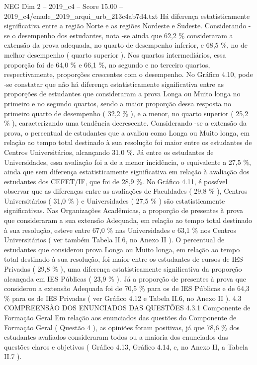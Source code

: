 \begin{textsample}{NEG Dim 2 – 2019\_c4 – Score 15.00 – 2019\_c4/enade\_2019\_arqui\_urb\_213c4ab7d4.txt}
Há diferença estatisticamente significativa entre a região Norte e as regiões Nordeste e Sudeste.
Considerando -se o desempenho dos estudantes, nota -se ainda que 62,2 \% consideraram a extensão da prova adequada, no quarto de desempenho inferior, e 68,5 \%, no de melhor desempenho ( quarto superior ).
Nos quartos intermediários, essa proporção foi de 64,0 \% e 66,1 \%, no segundo e no terceiro quartos, respectivamente, proporções crescentes com o desempenho.
No Gráfico 4.10, pode -se constatar que não há diferença estatisticamente significativa entre as proporções de estudantes que consideraram a prova Longa ou Muito longa no primeiro e no segundo quartos, sendo a maior proporção dessa resposta no primeiro quarto de desempenho ( 32,2 \% ), e a menor, no quarto superior ( 25,2 \% ), caracterizando uma tendência decrescente.
Considerando -se a extensão da prova, o percentual de estudantes que a avaliou como Longa ou Muito longa, em relação ao tempo total destinado à sua resolução foi maior entre os estudantes de Centros Universitários, alcançando 31,0 \%.
Já entre os estudantes de Universidades, essa avaliação foi a de a menor incidência, o equivalente a 27,5 \%, ainda que sem diferença estatisticamente significativa em relação à avaliação dos estudantes dos CEFET/IF, que foi de 28,9 \%.
No Gráfico 4.11, é possível observar que as diferenças entre as avaliações de Faculdades ( 29,8 \% ), Centros Universitários ( 31,0 \% ) e Universidades ( 27,5 \% ) são estatisticamente significativas.
Nas Organizações Acadêmicas, a proporção de presentes à prova que consideraram a sua extensão Adequada, em relação ao tempo total destinado à sua resolução, esteve entre 67,0 \% nas Universidades e 63,1 \% nos Centros Universitários ( ver também Tabela II.6, no Anexo II ).
O percentual de estudantes que considerou prova Longa ou Muito longa, em relação ao tempo total destinado à sua resolução, foi maior entre os estudantes de cursos de IES Privadas ( 29,8 \% ), uma diferença estatisticamente significativa da proporção alcançada em IES Públicas ( 23,9 \% ).
Já a proporção de presentes à prova que considerou a extensão Adequada foi de 70,5 \% para os de IES Públicas e de 64,3 \% para os de IES Privadas ( ver Gráfico 4.12 e Tabela II.6, no Anexo II ). 4.3 COMPREENSÃO DOS ENUNCIADOS DAS QUESTÕES 4.3.1 Componente de Formação Geral Em relação aos enunciados das questões do Componente de Formação Geral ( Questão 4 ), as opiniões foram positivas, já que 78,6 \% dos estudantes avaliados consideraram todos ou a maioria dos enunciados das questões claros e objetivos ( Gráfico 4.13, Gráfico 4.14, e, no Anexo II, a Tabela II.7 ).

\end{textsample}
